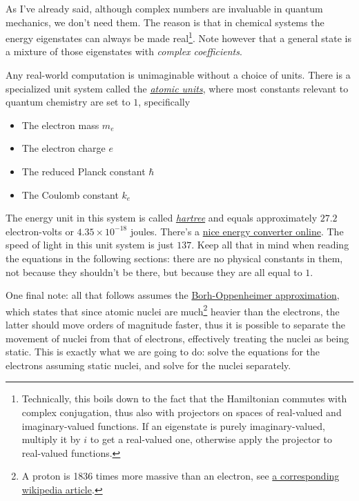 \documentclass{article}
\begin{document}
As I've already said, although complex numbers are invaluable in quantum mechanics, we don't need them. The reason is that in chemical systems the energy eigenstates can always be made real\footnote{Technically, this boils down to the fact that the Hamiltonian commutes with complex conjugation, thus also with projectors on spaces of real-valued and imaginary-valued functions. If an eigenstate is purely imaginary-valued, multiply it by \(i\) to get a real-valued one, otherwise apply the projector to real-valued functions.}. Note however that a general state is a mixture of those eigenstates with \textit{complex coefficients}.

Any real-world computation is unimaginable without a choice of units. There is a specialized unit system called the \href{https://en.wikipedia.org/wiki/Hartree_atomic_units}{\textit{atomic units}}, where most constants relevant to quantum chemistry are set to \(1\), specifically

\begin{itemize}
\item The electron mass \(m_e\)
\item The electron charge \(e\)
\item The reduced Planck constant \(\hbar\)
\item The Coulomb constant \(k_e\)
\end{itemize}

The energy unit in this system is called \href{https://en.wikipedia.org/wiki/Hartree}{\textit{hartree}} and equals approximately \(27.2\) electron-volts or \(4.35\times 10^{-18}\) joules. There's a \href{http://www.colby.edu/chemistry/PChem/Hartree.html}{nice energy converter online}. The speed of light in this unit system is just \(137\). Keep all that in mind when reading the equations in the following sections: there are no physical constants in them, not because they shouldn't be there, but because they are all equal to \(1\).

One final note: all that follows assumes the \href{https://en.wikipedia.org/wiki/Born\%E2\%80\%93Oppenheimer_approximation}{Borh-Oppenheimer approximation}, which states that since atomic nuclei are much\footnote{A proton is 1836 times more massive than an electron, see \href{https://en.wikipedia.org/wiki/Proton-to-electron_mass_ratio}{a corresponding wikipedia article}.} heavier than the electrons, the latter should move orders of magnitude faster, thus it is possible to separate the movement of nuclei from that of electrons, effectively treating the nuclei as being static. This is exactly what we are going to do: solve the equations for the electrons assuming static nuclei, and solve for the nuclei separately.
\end{document}
